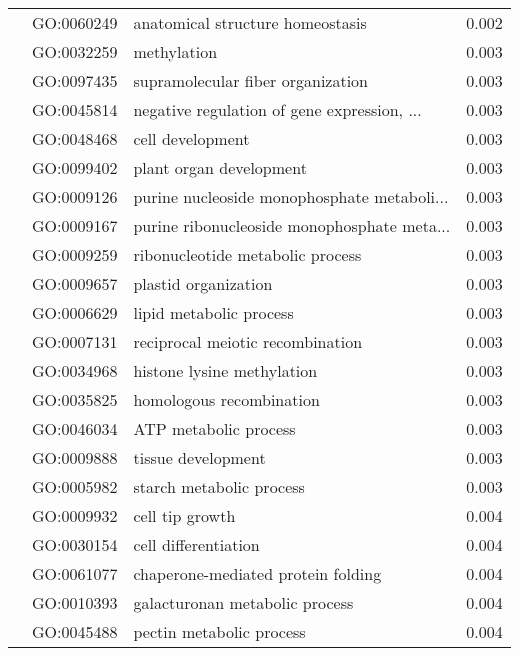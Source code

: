 \begin{longtable}{lllr}
   & GO:0060249 &             anatomical structure homeostasis &         0.002 \\
   & GO:0032259 &                                  methylation &         0.003 \\
   & GO:0097435 &            supramolecular fiber organization &         0.003 \\
   & GO:0045814 &  negative regulation of gene expression, ... &         0.003 \\
   & GO:0048468 &                             cell development &         0.003 \\
   & GO:0099402 &                      plant organ development &         0.003 \\
   & GO:0009126 &  purine nucleoside monophosphate metaboli... &         0.003 \\
   & GO:0009167 &  purine ribonucleoside monophosphate meta... &         0.003 \\
   & GO:0009259 &             ribonucleotide metabolic process &         0.003 \\
   & GO:0009657 &                         plastid organization &         0.003 \\
   & GO:0006629 &                      lipid metabolic process &         0.003 \\
   & GO:0007131 &             reciprocal meiotic recombination &         0.003 \\
   & GO:0034968 &                   histone lysine methylation &         0.003 \\
   & GO:0035825 &                     homologous recombination &         0.003 \\
   & GO:0046034 &                        ATP metabolic process &         0.003 \\
   & GO:0009888 &                           tissue development &         0.003 \\
   & GO:0005982 &                     starch metabolic process &         0.003 \\
   & GO:0009932 &                              cell tip growth &         0.004 \\
   & GO:0030154 &                         cell differentiation &         0.004 \\
   & GO:0061077 &           chaperone-mediated protein folding &         0.004 \\
   & GO:0010393 &               galacturonan metabolic process &         0.004 \\
   & GO:0045488 &                     pectin metabolic process &         0.004 \\

\end{longtable}

